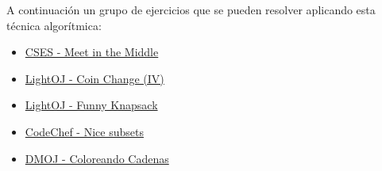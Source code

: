 A continuación un grupo de ejercicios que se pueden resolver aplicando esta técnica algorítmica:

\begin{itemize}
	\item \href{https://cses.fi/alon/task/1628}{CSES - Meet in the Middle}
	\item \href{https://lightoj.com/problem/coin-change-iv}{ LightOJ - Coin Change (IV) }
	\item \href{https://lightoj.com/problem/funny-knapsack}{ LightOJ - Funny Knapsack  }
	\item \href{https://www.codechef.com/INSQ2015/problems/INSQ15_C}{CodeChef - Nice subsets}
	\item \href{https://dmoj.uclv.edu.cu/problem/coloring}{DMOJ - Coloreando Cadenas}
\end{itemize}